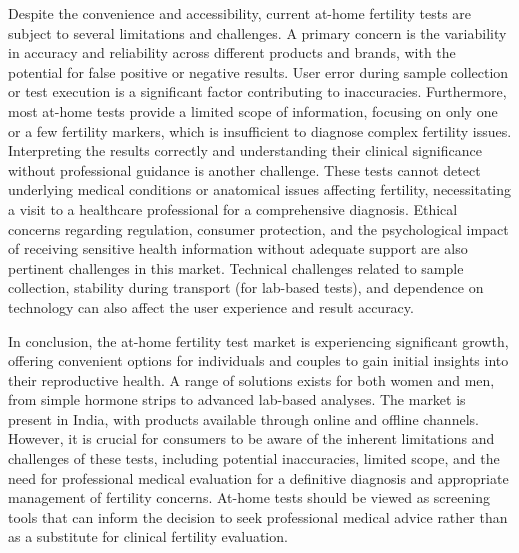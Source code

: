 \documentclass{article}
\begin{document}
Despite the convenience and accessibility, current at-home fertility tests are subject to several limitations and challenges. A primary concern is the variability in accuracy and reliability across different products and brands, with the potential for false positive or negative results. User error during sample collection or test execution is a significant factor contributing to inaccuracies. Furthermore, most at-home tests provide a limited scope of information, focusing on only one or a few fertility markers, which is insufficient to diagnose complex fertility issues. Interpreting the results correctly and understanding their clinical significance without professional guidance is another challenge. These tests cannot detect underlying medical conditions or anatomical issues affecting fertility, necessitating a visit to a healthcare professional for a comprehensive diagnosis. Ethical concerns regarding regulation, consumer protection, and the psychological impact of receiving sensitive health information without adequate support are also pertinent challenges in this market. Technical challenges related to sample collection, stability during transport (for lab-based tests), and dependence on technology can also affect the user experience and result accuracy.

In conclusion, the at-home fertility test market is experiencing significant growth, offering convenient options for individuals and couples to gain initial insights into their reproductive health. A range of solutions exists for both women and men, from simple hormone strips to advanced lab-based analyses. The market is present in India, with products available through online and offline channels. However, it is crucial for consumers to be aware of the inherent limitations and challenges of these tests, including potential inaccuracies, limited scope, and the need for professional medical evaluation for a definitive diagnosis and appropriate management of fertility concerns. At-home tests should be viewed as screening tools that can inform the decision to seek professional medical advice rather than as a substitute for clinical fertility evaluation.
\end{document}
